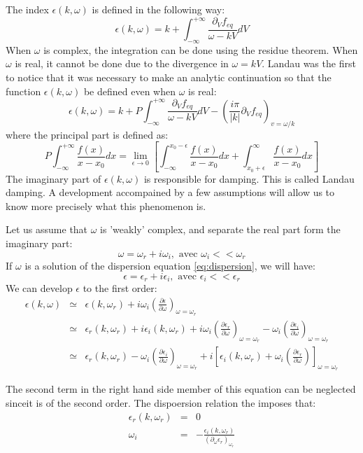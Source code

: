 The index $\epsilon(k,\omega)$ is defined in the following way:
\[
		\epsilon(k,\omega) = k + \int_{-\infty}^{+\infty} \frac{\partial_V f_{eq}}{\omega - kV}dV
\]
When $\omega$ is complex, the integration can be done using the residue theorem. When $\omega$  is real, it cannot be done due to the divergence in $\omega = kV$. Landau was the first to notice that it was necessary to make an analytic continuation so that the function $\epsilon(k,\omega)$ be defined even when $\omega$ is real:
\begin{equation}
		\epsilon(k,\omega) = k + P\int_{-\infty}^{+\infty} \frac{\partial_V f_{eq}}{\omega - kV}dV - \left( \frac{i\pi}{|k|}\partial_V f_{eq} \right)_{v=\omega/k}
\label{eq:ProlongementAnalytique}
\end{equation}
where the principal part is defined as:
\[
		P\int_{-\infty}^{+\infty} \frac{f(x)}{x-x_0}dx = \lim_{\epsilon\rightarrow 0}\left[ \int_{-\infty}^{x_0-\epsilon} \frac{f(x)}{x-x_0}dx + \int_{x_0+\epsilon}^{\infty} \frac{f(x)}{x-x_0}dx \right]
\]
The imaginary part of $\epsilon(k,\omega)$ is responsible for damping. This is called Landau damping. A development accompained by a few assumptions will allow us to know more precisely what this phenomenon is.

Let us assume that $\omega$ is 'weakly' complex, and separate the real part form the imaginary part:
\[
	\omega = \omega_r + i\omega_i, \mbox{ avec }	\omega_i << \omega_r
\]
If $\omega$ is a solution of the dispersion equation \ref{eq:dispersion}, we will have:
\[
	\epsilon = \epsilon_r  + i\epsilon_i, \mbox{ avec }	\epsilon_i << \epsilon_r
\]
We can develop $\epsilon$ to the first order:
\begin{eqnarray*}
	\epsilon(k,\omega) 	&	 \simeq  &  \epsilon(k,\omega_r) + i\omega_i \left( \frac{\partial\epsilon}{\partial\omega} \right)_{\omega = \omega_r}		\\
											&  \simeq  &  \epsilon_r(k,\omega_r) + i\epsilon_i(k,\omega_r) + i\omega_i \left( \frac{\partial\epsilon_r}{\partial\omega} \right)_{\omega = \omega_r}	- \omega_i \left( \frac{\partial\epsilon_i}{\partial\omega} \right)_{\omega = \omega_r}	\\
											&  \simeq  &  \epsilon_r(k,\omega_r) - \omega_i \left( \frac{\partial\epsilon_i}{\partial\omega} \right)_{\omega = \omega_r} + i\left[ \epsilon_i(k,\omega_r) + \omega_i \left( \frac{\partial\epsilon_r}{\partial\omega} \right) \right]_{\omega = \omega_r}
\end{eqnarray*}

The second term in the right hand side member of this equation can be neglected sinceit is of the second order. The dispoersion relation the imposes that:
\begin{eqnarray}
		\epsilon_r(k,\omega_r)  &  =  &  0		\nonumber\\
		\omega_i								&  =  &  - \frac{\epsilon_i(k,\omega_r)}{\left( \partial_\omega\epsilon_r \right)_{\omega_r}}		\label{eq:omega_i}
\end{eqnarray}

